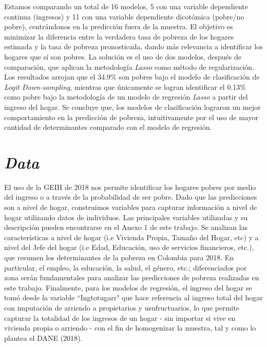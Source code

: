 \documentclass[11pt]{article}
\begin{document}
\justify
Estamos comparando un total de 16 modelos, 5 con una variable dependiente continua (ingresos) y 11 con una variable dependiente dicotómica (pobre/no pobre), centrándonos en la predicción fuera de la muestra. El objetivo es minimizar la diferencia entre la verdadera tasa de pobreza de los hogares estimada y la tasa de pobreza pronosticada, dando más relevancia a identificar los hogares que sí son pobres. La solución es el uso de dos modelos, después de comparación, que aplican la metodología \emph{Lasso} como método de regularización. Los resultados arrojan que el 34.9\% son pobres bajo el modelo de clasificación de \emph {Logit Down-sampling}, mientras que únicamente se logran identificar el 0.13\%  como pobre bajo la metodología de un modelo de regresión \emph{Lasso} a partir del ingreso del hogar. Se concluye que, los modelos de clasificación lograron un mejor comportamiento en la predicción de pobreza, intuitivamente por el uso de mayor cantidad de determinantes comparado con el modelo de regresión.

\section{\bf\emph {Data}} \label{sec:data}
\justify 
El uso de la GEIH de 2018 nos permite identificar los hogares pobres por medio del ingreso o a través de la probabilidad de ser pobre. Dado que las predicciones son a nivel de hogar, construimos variables para capturar información a nivel de hogar utilizando datos de individuos. Las principales variables utilizadas y su descripción pueden encontrarse en el Anexo 1 de este trabajo. Se analizan las características a nivel de hogar (i.e Vivienda Propia, Tamaño del Hogar, etc) y a nivel del Jefe del hogar (i.e Edad, Educación, uso de servicios financieros, etc.), que resumen los determinantes de la pobreza en Colombia para 2018. 
\justify
En particular, el empleo, la educación, la salud, el género, etc.; diferenciados por zona serán fundamentales para analizar las predicciones de pobreza realizadas en este trabajo. Finalmente, para los modelos de regresión, el ingreso del hogar se tomó desde la variable ``Ingtotugarr" que hace referencia al ingreso total del hogar con imputación de arriendo a
propietarios y usufructuarios, lo que permite capturar la totalidad de los ingresos de un hogar - sin importar si vive en vivienda propia o arriendo - con el fin de homogenizar la muestra, tal y como lo plantea el DANE (2018).
\end{document}
